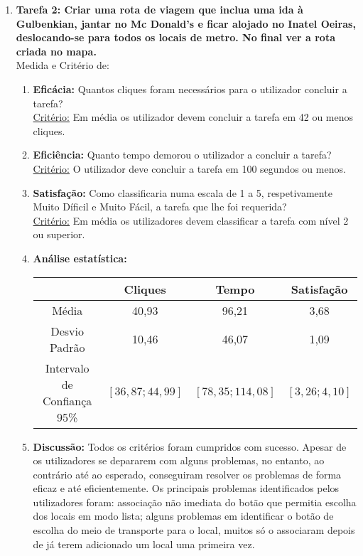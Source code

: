 \documentclass[11pt]{article}
\begin{document}
\begin{enumerate}
        \item \textbf{Tarefa 2: Criar uma rota de viagem que inclua uma ida à Gulbenkian, jantar no Mc Donald's e ficar alojado no Inatel Oeiras, deslocando-se para todos os locais de metro. No final ver a rota criada no mapa.}\\
        Medida e Critério de:
        \begin{enumerate}
            \item \textbf{Eficácia:} Quantos cliques foram necessários para o utilizador concluir a tarefa?\\
            \underline{Critério:} Em média os utilizador devem concluir a tarefa em 42 ou menos cliques.
            
            \item \textbf{Eficiência:} Quanto tempo demorou o utilizador a concluir a tarefa?\\
            \underline{Critério:} O utilizador deve concluir a tarefa em 100 segundos ou menos.
            
            \item \textbf{Satisfação:} Como classificaria numa escala de 1 a 5, respetivamente Muito Díficil e Muito Fácil, a tarefa que lhe foi requerida?\\
            \underline{Critério:} Em média os utilizadores devem classificar a tarefa com nível 2 ou superior.
            
            \item \textbf{Análise estatística:} \\
\begin{center}
 \begin{tabular}{|c | c c c|} 
 \hline
   & Cliques & Tempo & Satisfação \\ [0.5ex] 
 \hline
 Média & 40,93 & 96,21 & 3,68 \\ 
 \hline
 Desvio Padrão & 10,46 & 46,07 & 1,09 \\
 \hline
 Intervalo de Confiança 95\% & $[36,87;44,99]$ & $[78,35;114,08]$ & $[3,26;4,10]$ \\

 \hline
\end{tabular}
\end{center}
            
            \item \textbf{Discussão:} Todos os critérios foram cumpridos com sucesso.
            Apesar de os utilizadores se depararem com alguns problemas, no entanto, ao contrário até ao esperado, conseguiram resolver os problemas de forma eficaz e até eficientemente.
            Os principais problemas identificados pelos utilizadores foram: associação não imediata do botão que permitia escolha dos locais em modo lista; alguns problemas em identificar o botão de escolha do meio de transporte para o local, muitos só o associaram depois de já terem adicionado um local uma primeira vez.
        \end{enumerate}
        

\end{enumerate}
\end{document}
